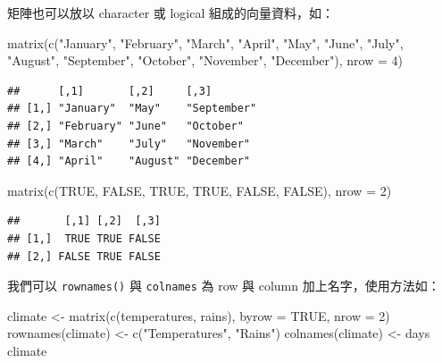 \documentclass[
]{book}
\newenvironment{Shaded}{\begin{snugshade}}{\end{snugshade}}
\newcommand{\AttributeTok}[1]{\textcolor[rgb]{0.77,0.63,0.00}{#1}}
\newcommand{\ConstantTok}[1]{\textcolor[rgb]{0.00,0.00,0.00}{#1}}
\newcommand{\DecValTok}[1]{\textcolor[rgb]{0.00,0.00,0.81}{#1}}
\newcommand{\FunctionTok}[1]{\textcolor[rgb]{0.00,0.00,0.00}{#1}}
\newcommand{\NormalTok}[1]{#1}
\newcommand{\OtherTok}[1]{\textcolor[rgb]{0.56,0.35,0.01}{#1}}
\newcommand{\StringTok}[1]{\textcolor[rgb]{0.31,0.60,0.02}{#1}}
\theoremstyle{definition}
\theoremstyle{remark}
\begin{document}
矩陣也可以放以 character 或 logical 組成的向量資料，如：

\begin{Shaded}
\begin{Highlighting}[]
\FunctionTok{matrix}\NormalTok{(}\FunctionTok{c}\NormalTok{(}\StringTok{"January"}\NormalTok{, }\StringTok{"February"}\NormalTok{, }\StringTok{"March"}\NormalTok{, }\StringTok{"April"}\NormalTok{, }\StringTok{"May"}\NormalTok{, }\StringTok{"June"}\NormalTok{, }\StringTok{"July"}\NormalTok{, }\StringTok{"August"}\NormalTok{, }\StringTok{"September"}\NormalTok{, }\StringTok{"October"}\NormalTok{, }\StringTok{"November"}\NormalTok{, }\StringTok{"December"}\NormalTok{), }\AttributeTok{nrow =} \DecValTok{4}\NormalTok{)}
\end{Highlighting}
\end{Shaded}

\begin{verbatim}
##      [,1]       [,2]     [,3]       
## [1,] "January"  "May"    "September"
## [2,] "February" "June"   "October"  
## [3,] "March"    "July"   "November" 
## [4,] "April"    "August" "December"
\end{verbatim}

\begin{Shaded}
\begin{Highlighting}[]
\FunctionTok{matrix}\NormalTok{(}\FunctionTok{c}\NormalTok{(}\ConstantTok{TRUE}\NormalTok{, }\ConstantTok{FALSE}\NormalTok{, }\ConstantTok{TRUE}\NormalTok{, }\ConstantTok{TRUE}\NormalTok{, }\ConstantTok{FALSE}\NormalTok{, }\ConstantTok{FALSE}\NormalTok{), }\AttributeTok{nrow =} \DecValTok{2}\NormalTok{)}
\end{Highlighting}
\end{Shaded}

\begin{verbatim}
##       [,1] [,2]  [,3]
## [1,]  TRUE TRUE FALSE
## [2,] FALSE TRUE FALSE
\end{verbatim}

我們可以 \texttt{rownames()} 與 \texttt{colnames} 為 row 與 column 加上名字，使用方法如：

\begin{Shaded}
\begin{Highlighting}[]
\NormalTok{climate }\OtherTok{\textless{}{-}} \FunctionTok{matrix}\NormalTok{(}\FunctionTok{c}\NormalTok{(temperatures, rains), }\AttributeTok{byrow =} \ConstantTok{TRUE}\NormalTok{, }\AttributeTok{nrow =} \DecValTok{2}\NormalTok{)}
\FunctionTok{rownames}\NormalTok{(climate) }\OtherTok{\textless{}{-}} \FunctionTok{c}\NormalTok{(}\StringTok{"Temperatures"}\NormalTok{, }\StringTok{"Rains"}\NormalTok{)}
\FunctionTok{colnames}\NormalTok{(climate) }\OtherTok{\textless{}{-}}\NormalTok{ days}
\NormalTok{climate}
\end{Highlighting}
\end{Shaded}
\end{document}

